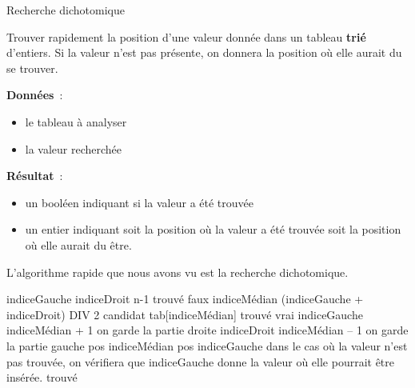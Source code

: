 \begin{Fiche}{Recherche dichotomique}
\label{fiche:dicho}

	Trouver rapidement la position d’une valeur donnée dans un tableau
	\textbf{trié} d’entiers. 
	Si la valeur n’est pas présente, 
	on donnera la position où elle aurait du se trouver.

	
	\textbf{Données}~: 
		\begin{itemize}
		\item le tableau à analyser
		\item la valeur recherchée
		\end{itemize}
		
	\textbf{Résultat}~:
		\begin{itemize}
		\item un booléen indiquant si la valeur a été trouvée
		\item un entier indiquant
			soit la position où la valeur a été trouvée
			soit la position où elle aurait du être.
		\end{itemize}


		L’algorithme rapide que nous avons vu est la recherche
		dichotomique.
		
		\begin{LDA}
				\Empty
				\Let indiceGauche 
				\Let indiceDroit \Gets n-1
				\Let trouvé \Gets faux
				\Empty
					\Let indiceMédian \Gets (indiceGauche + indiceDroit) DIV 2
					\Let candidat \Gets tab[indiceMédian]
						\Let trouvé \Gets vrai
						\Let indiceGauche \Gets indiceMédian + 1
						\RComment on garde la partie droite
					\Else
						\Let indiceDroit \Gets indiceMédian – 1
						\RComment on garde la partie gauche
					\EndIf
				\EndWhile
				\Empty
					\Let pos \Gets indiceMédian
				\Else
					\Let pos \Gets indiceGauche
					\RComment dans le cas où la valeur n’est pas trouvée,
					\Empty 
					\RComment on vérifiera que indiceGauche donne la valeur où elle pourrait être insérée.
				\EndIf
				\Empty
				\Return trouvé
			\EndAlgo
		\end{LDA}	
	
\end{Fiche}
